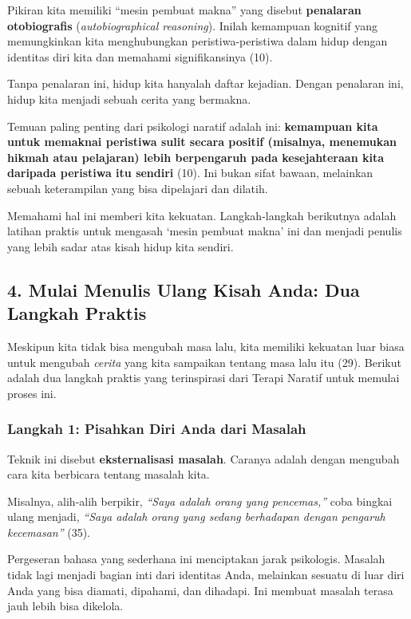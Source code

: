 \documentclass[
  letterpaper,
  DIV=11,
  numbers=noendperiod]{scrreprt}
\begin{document}
Pikiran kita memiliki ``mesin pembuat makna'' yang disebut
\textbf{penalaran otobiografis} (\emph{autobiographical reasoning}).
Inilah kemampuan kognitif yang memungkinkan kita menghubungkan
peristiwa-peristiwa dalam hidup dengan identitas diri kita dan memahami
signifikansinya (10).

Tanpa penalaran ini, hidup kita hanyalah daftar kejadian. Dengan
penalaran ini, hidup kita menjadi sebuah cerita yang bermakna.

Temuan paling penting dari psikologi naratif adalah ini:
\textbf{kemampuan kita untuk memaknai peristiwa sulit secara positif
(misalnya, menemukan hikmah atau pelajaran) lebih berpengaruh pada
kesejahteraan kita daripada peristiwa itu sendiri} (10). Ini bukan sifat
bawaan, melainkan sebuah keterampilan yang bisa dipelajari dan dilatih.

Memahami hal ini memberi kita kekuatan. Langkah-langkah berikutnya
adalah latihan praktis untuk mengasah `mesin pembuat makna' ini dan
menjadi penulis yang lebih sadar atas kisah hidup kita sendiri.

\subsection{\texorpdfstring{\textbf{4. Mulai Menulis Ulang Kisah Anda:
Dua Langkah
Praktis}}{4. Mulai Menulis Ulang Kisah Anda: Dua Langkah Praktis}}\label{mulai-menulis-ulang-kisah-anda-dua-langkah-praktis}

Meskipun kita tidak bisa mengubah masa lalu, kita memiliki kekuatan luar
biasa untuk mengubah \emph{cerita} yang kita sampaikan tentang masa lalu
itu (29). Berikut adalah dua langkah praktis yang terinspirasi dari
Terapi Naratif untuk memulai proses ini.

\subsubsection{Langkah 1: Pisahkan Diri Anda dari
Masalah}\label{langkah-1-pisahkan-diri-anda-dari-masalah}

Teknik ini disebut \textbf{eksternalisasi masalah}. Caranya adalah
dengan mengubah cara kita berbicara tentang masalah kita.

Misalnya, alih-alih berpikir, \emph{``Saya adalah orang yang
pencemas,''} coba bingkai ulang menjadi, \emph{``Saya adalah orang yang
sedang berhadapan dengan pengaruh kecemasan''} (35).

Pergeseran bahasa yang sederhana ini menciptakan jarak psikologis.
Masalah tidak lagi menjadi bagian inti dari identitas Anda, melainkan
sesuatu di luar diri Anda yang bisa diamati, dipahami, dan dihadapi. Ini
membuat masalah terasa jauh lebih bisa dikelola.
\end{document}
